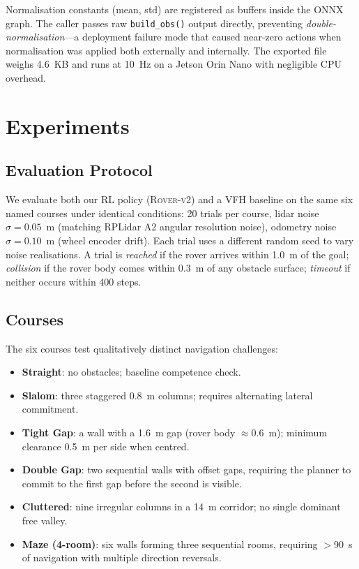 \documentclass[letterpaper, 10pt, journal]{IEEEtran}
\begin{document}
Normalisation constants (mean, std) are registered as buffers inside the ONNX graph.
The caller passes raw \texttt{build\_obs()} output directly, preventing
\emph{double-normalisation}---a deployment failure mode that caused near-zero actions
when normalisation was applied both externally and internally. The exported file
weighs 4.6~KB and runs at 10~Hz on a Jetson Orin Nano with negligible CPU overhead.

\section{Experiments}

\subsection{Evaluation Protocol}

We evaluate both our RL policy (\textsc{Rover-v2}) and a VFH baseline on the same
six named courses under identical conditions: 20 trials per course, lidar noise
$\sigma{=}0.05$~m (matching RPLidar A2 angular resolution noise), odometry noise
$\sigma{=}0.10$~m (wheel encoder drift). Each trial uses a different random seed to
vary noise realisations. A trial is \emph{reached} if the rover arrives within 1.0~m
of the goal; \emph{collision} if the rover body comes within 0.3~m of any obstacle
surface; \emph{timeout} if neither occurs within 400 steps.

\subsection{Courses}

The six courses test qualitatively distinct navigation challenges:

\begin{itemize}
  \item \textbf{Straight}: no obstacles; baseline competence check.
  \item \textbf{Slalom}: three staggered 0.8~m columns; requires alternating
    lateral commitment.
  \item \textbf{Tight Gap}: a wall with a 1.6~m gap (rover body $\approx$0.6~m);
    minimum clearance 0.5~m per side when centred.
  \item \textbf{Double Gap}: two sequential walls with offset gaps, requiring
    the planner to commit to the first gap before the second is visible.
  \item \textbf{Cluttered}: nine irregular columns in a 14~m corridor;
    no single dominant free valley.
  \item \textbf{Maze (4-room)}: six walls forming three sequential rooms,
    requiring $>$90~s of navigation with multiple direction reversals.
\end{itemize}
\end{document}
